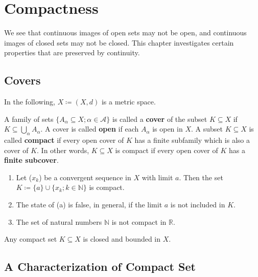 \chapter{Compactness}
We see that continuous images of open sets may not be open, and continuous images of closed 
sets may not be closed. This chapter investigates certain properties that are preserved by 
continuity. 

\section{Covers}

In the following, \(X \coloneqq \left(X, d\right)\) is a metric space. 

A family of sets \(\{ A_\alpha \subseteq X; \alpha \in \mathcal{A} \}\) is called a 
\textbf{cover} of the subset \(K \subseteq X\) if \(K \subseteq \bigcup_\alpha A_\alpha\). 
A cover is called \textbf{open} if each \(A_\alpha\) is open in \(X\). A subset \(K \subseteq X\)
is called \textbf{compact} if every open cover of \(K\) has a finite subfamily which is also 
a cover of \(K\). In other words, \(K \subseteq X\) is compact if every open cover of \(K\)
has a \textbf{finite subcover}. 

\begin{eg}
    \begin{enumerate}[label=(\alph*)]
        \item Let (\(x_k\)) be a convergent sequence in \(X\) with limit \(a\). Then the 
        set \(K \coloneqq \{a\} \cup \{x_k ; k \in \mathbb{N}\} \) is compact. 
        \item The state of (a) is false, in general, if the limit \(a\) is not included in \(K\). 
        \item The set of natural numbers \(\mathbb{N}\) is not compact in \(\mathbb{R}\). 
    \end{enumerate}
\end{eg}

\begin{proposition}
    Any compact set \(K \subseteq X\) is closed and bounded in \(X\). 
\end{proposition}

\section{A Characterization of Compact Set}


